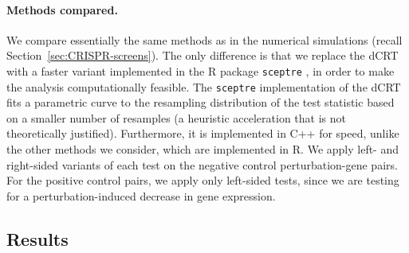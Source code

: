 \documentclass[12pt]{article}
\theoremstyle{definition}
\begin{document}
  \paragraph{Methods compared.} We compare essentially the same methods as in the numerical simulations (recall Section~\ref{sec:CRISPR-screens}). The only difference is that we replace the dCRT with a faster variant implemented in the R package \verb|sceptre| \citep{Barry2024,Katsevich2020c}, in order to make the analysis computationally feasible. The \verb|sceptre| implementation of the dCRT fits a parametric curve to the resampling distribution of the test statistic based on a smaller number of resamples (a heuristic acceleration that is not theoretically justified). Furthermore, it is implemented in C++ for speed, unlike the other methods we consider, which are implemented in R. We apply left- and right-sided variants of each test on the negative control perturbation-gene pairs. For the positive control pairs, we apply only left-sided tests, since we are testing for a perturbation-induced decrease in gene expression.
  
  \subsection{Results}
  
\end{document}
